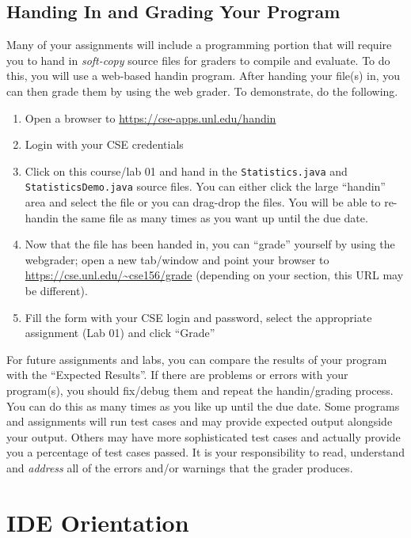 \documentclass[12pt]{scrartcl}
\begin{document}
\subsection{Handing In and Grading Your Program}
\label{subsection:handinGrader}

Many of your assignments will include a programming portion that will 
require you to hand in \emph{soft-copy} source files for graders to 
compile and evaluate.  To do this, you will use a web-based handin 
program.  After handing your file(s) in, you can then grade them by 
using the web grader.  To demonstrate, do the following.

\begin{enumerate}
  \item Open a browser to \url{https://cse-apps.unl.edu/handin}
  \item Login with your CSE credentials
  \item Click on this course/lab 01 and hand in the 
  	\texttt{Statistics.java} and \texttt{StatisticsDemo.java} source files.  You can
  	either click the large ``handin'' area and select the file or you 
	can drag-drop the files.  You will be able to re-handin the same 
	file as many times as you want up until the due date.
  \item Now that the file has been handed in, you can ``grade'' yourself 
  	by using the webgrader; open a new tab/window and point your browser 
	to \url{https://cse.unl.edu/~cse156/grade} (depending on your
	section, this URL may be different).
  \item Fill the form with your CSE login and password, select the 
  	appropriate assignment (Lab 01) and click ``Grade''
\end{enumerate}

For future assignments and labs, you can compare the results of 
your program with the ``Expected Results''.  If there are problems or
errors with your program(s), you should fix/debug them and repeat the
handin/grading process.  You can do this as many times as you like up 
until the due date.  Some programs and assignments will run test cases 
and may provide expected output alongside your output.  Others may 
have more sophisticated test cases and actually provide you a percentage 
of test cases passed.  It is your responsibility to read, understand 
and \emph{address} all of the errors and/or warnings that the grader 
produces.

\section{IDE Orientation}
\end{document}
